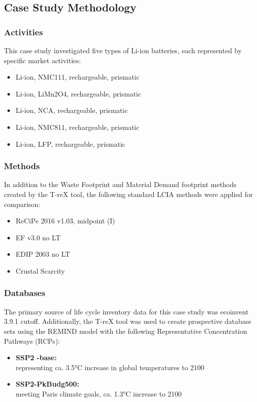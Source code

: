 \subsection{Case Study Methodology}\label{sec:method-case_study}

\subsubsection{Activities}
This case study investigated five types of Li-ion batteries, each represented by specific market activities:
\begin{itemize}[itemsep=0pt]
    \item Li-ion, NMC111, rechargeable, prismatic
    \item Li-ion, LiMn2O4, rechargeable, prismatic
    \item Li-ion, NCA, rechargeable, prismatic
    \item Li-ion, NMC811, rechargeable, prismatic
    \item Li-ion, LFP, rechargeable, prismatic
\end{itemize}

\subsubsection{Methods}
In addition to the Waste Footprint and Material Demand footprint methods created by the T-reX tool, the following standard LCIA methods were applied for comparison:
\begin{itemize}[itemsep=0pt]
    \item ReCiPe 2016 v1.03, midpoint (I)
    \item EF v3.0 no LT
    \item EDIP 2003 no LT
    \item Crustal Scarcity
\end{itemize}

\subsubsection{Databases}
The primary source of life cycle inventory data for this case study was ecoinvent 3.9.1 cutoff. Additionally, the T-reX tool was used to create prospective database sets using the \mbox{REMIND} model with the following Representative Concentration Pathways (RCPs):
\begin{itemize}
    \item \textbf{SSP2 -base:}\\ representing ca. 3.5°C increase in global temperatures to 2100
    \item \textbf{SSP2-PkBudg500:}\\ meeting Paris climate goals, ca. 1.3°C increase to 2100
\end{itemize}

